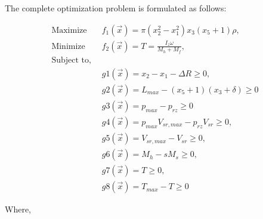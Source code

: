 The complete optimization problem is formulated as follows:

\begin{singlespacing}
\begin{flushleft}

{\allowdisplaybreaks
  \begin{align}
    \text{Maximize} \quad & f_1(\vec{x}) =  \pi (x_{2}^{2} - x_{1}^{2}) x_3 (x_5  + 1) \rho,\\
    \text{Minimize} \quad & f_2(\vec{x}) = T = \left. \frac{I_{z} \omega} {M_{h} + M_{f}} \right.,\\
    \text{Subject to,} & \nonumber \\
    \qquad &g1(\vec{x}) =  \left. x_2 - x_1 - \Delta R \geqslant 0 \right.,\\
    \qquad &g2(\vec{x}) = \left. L_{max} - (x_5 + 1)(x_3 + \delta) \geqslant 0 \right. \\
    \qquad &g3(\vec{x}) = \left. p_{max} - p_{rz} \geqslant 0 \right.\\
    \qquad &g4(\vec{x}) = \left. p_{max} V_{sr,max} - p_{rz} V_{sr} \geqslant 0 \right., \\
    \qquad &g5(\vec{x}) = \left. V_{sr, max} - V_{sr} \geqslant 0 \right., \\
    \qquad &g6(\vec{x}) = \left. M_{h} - s M_{s} \geqslant 0 \right., \\
    \qquad &g7(\vec{x}) = \left. T \geqslant 0 \right., \\
    \qquad &g8(\vec{x}) = \left. T_{max} - T \geqslant 0 \right.
  \end{align}
}

Where, 


\end{flushleft}
\end{singlespacing}
